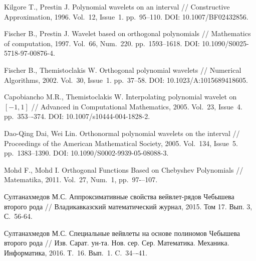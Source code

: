 \begin{thebibliography}{999}

 Kilgore T., Prestin J. Polynomial wavelets on an interval // Constructive Approximation, 1996. Vol.~12, Issue~1. pp.~95--110. DOI: 10.1007/BF02432856.




 Fischer B., Prestin J. Wavelet based on orthogonal polynomials // Mathematics of computation, 1997. Vol.~66, Num.~220. pp.~1593--1618. DOI: 10.1090/S0025-5718-97-00876-4.




 Fischer B., Themistoclakis W. Orthogonal polynomial wavelets // Numerical Algorithms, 2002. Vol.~30, Issue~1. pp.~37--58. DOI: 10.1023/A:1015689418605.




 Capobiancho M.R., Themistoclakis W. Interpolating polynomial wavelet on $[-1,1]$ // Advanced in Computational Mathematics, 2005. Vol.~23, Issue~4. pp.~353–-374. DOI: 10.1007/s10444-004-1828-2.




 Dao-Qing Dai, Wei Lin. Orthonormal polynomial wavelets on the interval // Proceedings of the American Mathematical Society, 2005. Vol.~134, Issue~5. pp.~1383–1390. DOI: 10.1090/S0002-9939-05-08088-3.




 Mohd F., Mohd I. Orthogonal Functions Based on Chebyshev Polynomials // Matematika, 2011. Vol.~27, Num.~1, pp.~97-–107.




 Султанахмедов М.С. Аппроксимативные свойства вейвлет-рядов Чебышева второго рода  // Владикавказский математический журнал, 2015. Том 17. Вып. 3, С.~56-64.




 Султанахмедов М.С. Специальные вейвлеты на основе полиномов Чебышева второго рода  //
Изв. Сарат. ун-та. Нов. сер. Сер. Математика. Механика. Информатика, 2016. Т.~16. Вып.~1. C.~34–-41.











\end{thebibliography}
